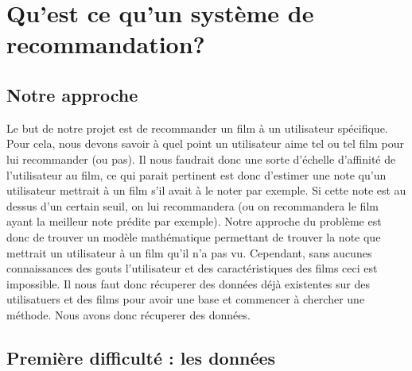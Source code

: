 \documentclass[a4paper,10pt]{article}
\title{}
\author{}
\begin{document}
\maketitle

\begin{abstract}
\end{abstract}

\section{Qu'est ce qu'un système de recommandation?}
\subsection{Notre approche}
Le but de notre projet est de recommander un film à un utilisateur spécifique. 
Pour cela, nous devons savoir à quel point un utilisateur aime tel ou tel film pour lui recommander (ou pas). 
Il nous faudrait donc une sorte d'échelle d'affinité de l'utilisateur au film, ce qui parait pertinent est donc d'estimer une note qu'un utilisateur mettrait à un film s'il avait à le noter par exemple. 
Si cette note est au dessus d'un certain seuil, on lui recommandera (ou on recommandera le film ayant la meilleur note prédite par exemple). 
Notre approche du problème est donc de trouver un modèle mathématique permettant de trouver la note que mettrait un utilisateur à un film qu'il n'a pas vu. 
Cependant, sans aucunes connaissances des gouts l'utilisateur et des caractéristiques des films ceci est impossible. Il nous faut donc récuperer des données déjà existentes sur des utilisatuers et des films pour avoir une base et commencer à chercher une méthode.  
Nous avons donc récuperer des données.

\subsection{Première difficulté : les données}
\end{document}
